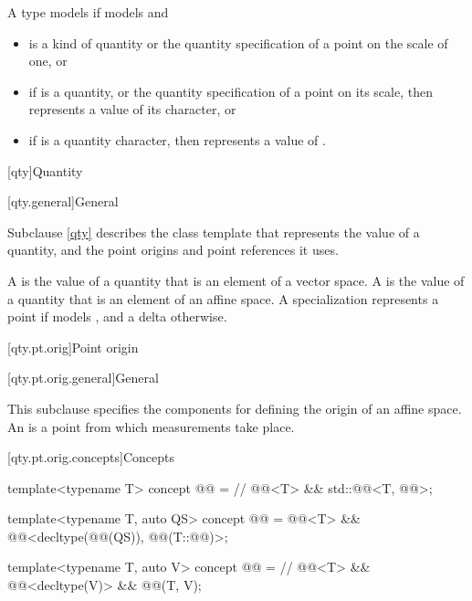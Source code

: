 \pnum
A type  models  if
 models  and
\begin{itemize}
\item
{} is a kind of quantity or the quantity specification of a point on the scale of one, or
\item
if  is a quantity, or the quantity specification of a point on its scale,
then  represents a value of its character, or
\item
if  is a quantity character, then  represents a value of .
\end{itemize}

[qty]{Quantity}

[qty.general]{General}

\pnum
Subclause \ref{qty} describes the class template 
that represents the value of a quantity,
and the point origins and point references it uses.

\pnum
A  is the value of a quantity
that is an element of a vector space.
A  is the value of a quantity
that is an element of an affine space.
A specialization  represents a point
if  models ,
and a delta otherwise.

[qty.pt.orig]{Point origin}

[qty.pt.orig.general]{General}

\pnum
This subclause specifies the components
for defining the origin of an affine space.
An  is a point from which measurements take place.

[qty.pt.orig.concepts]{Concepts}

\begin{itemdecl}
template<typename T>
concept @@ =                     // \expos
  @@<T> && std::@@<T, @@>;

template<typename T, auto QS>
concept @@ =
  @@<T> &&
  @@<decltype(@@(QS)), @@(T::@@)>;

template<typename T, auto V>
concept @@ =  // \expos
  @@<T> && @@<decltype(V)> && @@(T{}, V);
\end{itemdecl}


